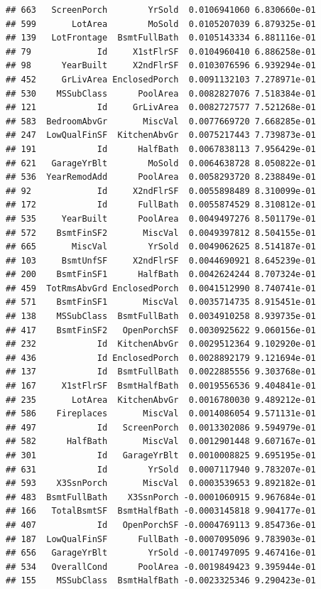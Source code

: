 \documentclass[american,]{article}
\theoremstyle{definition}
\theoremstyle{definition}
\theoremstyle{definition}
\theoremstyle{remark}
\begin{document}
\begin{verbatim}
## 663   ScreenPorch        YrSold  0.0106941060 6.830660e-01
## 599       LotArea        MoSold  0.0105207039 6.879325e-01
## 139   LotFrontage  BsmtFullBath  0.0105143334 6.881116e-01
## 79             Id     X1stFlrSF  0.0104960410 6.886258e-01
## 98      YearBuilt     X2ndFlrSF  0.0103076596 6.939294e-01
## 452     GrLivArea EnclosedPorch  0.0091132103 7.278971e-01
## 530    MSSubClass      PoolArea  0.0082827076 7.518384e-01
## 121            Id     GrLivArea  0.0082727577 7.521268e-01
## 583  BedroomAbvGr       MiscVal  0.0077669720 7.668285e-01
## 247  LowQualFinSF  KitchenAbvGr  0.0075217443 7.739873e-01
## 191            Id      HalfBath  0.0067838113 7.956429e-01
## 621   GarageYrBlt        MoSold  0.0064638728 8.050822e-01
## 536  YearRemodAdd      PoolArea  0.0058293720 8.238849e-01
## 92             Id     X2ndFlrSF  0.0055898489 8.310099e-01
## 172            Id      FullBath  0.0055874529 8.310812e-01
## 535     YearBuilt      PoolArea  0.0049497276 8.501179e-01
## 572    BsmtFinSF2       MiscVal  0.0049397812 8.504155e-01
## 665       MiscVal        YrSold  0.0049062625 8.514187e-01
## 103     BsmtUnfSF     X2ndFlrSF  0.0044690921 8.645239e-01
## 200    BsmtFinSF1      HalfBath  0.0042624244 8.707324e-01
## 459  TotRmsAbvGrd EnclosedPorch  0.0041512990 8.740741e-01
## 571    BsmtFinSF1       MiscVal  0.0035714735 8.915451e-01
## 138    MSSubClass  BsmtFullBath  0.0034910258 8.939735e-01
## 417    BsmtFinSF2   OpenPorchSF  0.0030925622 9.060156e-01
## 232            Id  KitchenAbvGr  0.0029512364 9.102920e-01
## 436            Id EnclosedPorch  0.0028892179 9.121694e-01
## 137            Id  BsmtFullBath  0.0022885556 9.303768e-01
## 167     X1stFlrSF  BsmtHalfBath  0.0019556536 9.404841e-01
## 235       LotArea  KitchenAbvGr  0.0016780030 9.489212e-01
## 586    Fireplaces       MiscVal  0.0014086054 9.571131e-01
## 497            Id   ScreenPorch  0.0013302086 9.594979e-01
## 582      HalfBath       MiscVal  0.0012901448 9.607167e-01
## 301            Id   GarageYrBlt  0.0010008825 9.695195e-01
## 631            Id        YrSold  0.0007117940 9.783207e-01
## 593    X3SsnPorch       MiscVal  0.0003539653 9.892182e-01
## 483  BsmtFullBath    X3SsnPorch -0.0001060915 9.967684e-01
## 166   TotalBsmtSF  BsmtHalfBath -0.0003145818 9.904177e-01
## 407            Id   OpenPorchSF -0.0004769113 9.854736e-01
## 187  LowQualFinSF      FullBath -0.0007095096 9.783903e-01
## 656   GarageYrBlt        YrSold -0.0017497095 9.467416e-01
## 534   OverallCond      PoolArea -0.0019849423 9.395944e-01
## 155    MSSubClass  BsmtHalfBath -0.0023325346 9.290423e-01

\end{verbatim}
\end{document}
